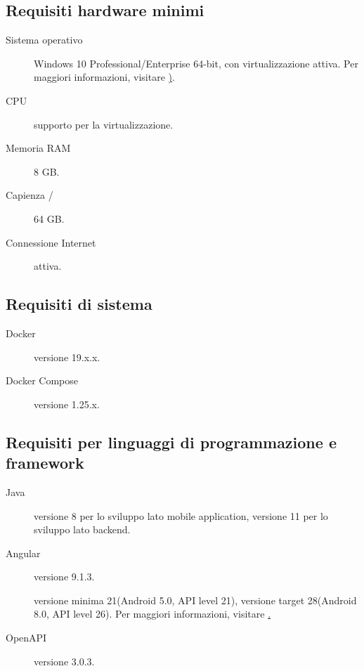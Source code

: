 \documentclass[../../../manuale-sviluppatore.tex]{subfiles}
\begin{document}
\subsection{Requisiti hardware minimi}%
\label{sub:requisiti_hardware_minimi}

\begin{description}
    \item[Sistema operativo] Windows 10 Professional/Enterprise 64-bit, con virtualizzazione  attiva. Per maggiori informazioni, visitare \href{https://docs.microsoft.com/it-it/virtualization/hyper-v-on-windows/quick-start/enable-hyper-v}).
    \item[CPU] supporto per la virtualizzazione.
    \item[Memoria RAM] 8 GB\@.
    \item[Capienza /] 64 GB\@.
    \item[Connessione Internet] attiva.
\end{description}

\subsection{Requisiti di sistema}%
\label{sub:requisiti_di_sistema}

\begin{description}
    \item[Docker] versione 19.x.x.
    \item[Docker Compose] versione 1.25.x.
\end{description}

\subsection{Requisiti per linguaggi di programmazione e framework}%
\label{sub:requisiti_per_linguaggi_di_programmazione_e_framwework}

\begin{description}
  \item[Java] versione 8 per lo sviluppo lato mobile application, versione 11 per lo sviluppo lato backend.
  \item[Angular] versione 9.1.3.
  \item[] versione minima 21(Android 5.0, API level 21), versione target 28(Android 8.0, API level 26). Per maggiori informazioni, visitare \href{https://developer.android.com/studio/releases/platforms}.
  \item[OpenAPI] versione 3.0.3.
\end{description}
\end{document}
